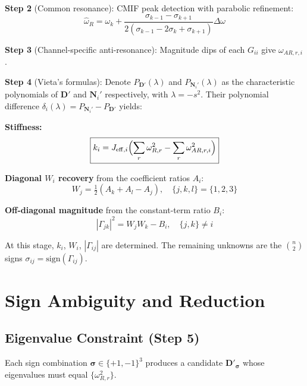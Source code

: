 \documentclass[10pt,twocolumn]{article}
\newcommand{\sgn}{\mathrm{sign}}
\begin{document}
\textbf{Step 2} (Common resonance): CMIF peak detection with parabolic refinement:
\begin{equation}
\hat{\omega}_R = \omega_k + \frac{\sigma_{k-1}-\sigma_{k+1}}{2(\sigma_{k-1}-2\sigma_k+\sigma_{k+1})} \Delta\omega
\label{eq:parabolic}
\end{equation}

\textbf{Step 3} (Channel-specific anti-resonance): Magnitude dips of each $G_{ii}$ give $\omega_{AR,r,i}$.

\textbf{Step 4} (Vieta's formulas): Denote $P_{\bm{D}'}(\lambda)$ and $P_{\bm{N}_i'}(\lambda)$ as the characteristic polynomials of $\bm{D}'$ and $\bm{N}_i'$ respectively, with $\lambda = -s^2$. Their polynomial difference $\delta_i(\lambda) = P_{\bm{N}_i'} - P_{\bm{D}'}$ yields:

\noindent\textbf{Stiffness:}
\begin{equation}
\boxed{k_i = J_{\mathrm{eff},i} \Bigl(\sum_r \omega_{R,r}^2 - \sum_r \omega_{AR,r,i}^2\Bigr)}
\label{eq:K}
\end{equation}

\noindent\textbf{Diagonal $W_i$ recovery} from the coefficient ratios $A_i$:
\begin{equation}
W_j = \tfrac{1}{2}(A_k + A_l - A_j), \quad \{j,k,l\} = \{1,2,3\}
\label{eq:W_recovery}
\end{equation}

\noindent\textbf{Off-diagonal magnitude} from the constant-term ratio $B_i$:
\begin{equation}
|\Gamma_{jk}|^2 = W_j W_k - B_i, \quad \{j,k\} \neq i
\label{eq:Gamma_abs}
\end{equation}

At this stage, $k_i$, $W_i$, $|\Gamma_{ij}|$ are determined. The remaining unknowns are the $\binom{n}{2}$ signs $\sigma_{ij} = \sgn(\Gamma_{ij})$.

\section{Sign Ambiguity and Reduction}
\label{sec:sign_ambiguity}

\subsection{Eigenvalue Constraint (Step 5)}

Each sign combination $\bm{\sigma} \in \{+1,-1\}^3$ produces a candidate $\bm{D}'_{\bm{\sigma}}$ whose eigenvalues must equal $\{\omega_{R,r}^2\}$.
\end{document}
